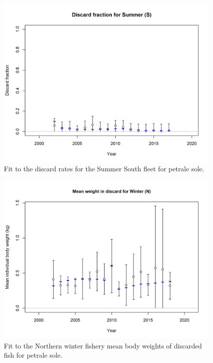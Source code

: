 \documentclass[12pt,]{article}
\begin{document}
\FloatBarrier

\begin{figure}
\centering
\includegraphics{r4ss/plots_mod1/discard_fitSummer (S).png}
\caption{Fit to the discard rates for the Summer South fleet for petrale
sole. \label{fig:fit_ss_discard}}
\end{figure}

\FloatBarrier

\begin{figure}
\centering
\includegraphics{r4ss/plots_mod1/bodywt_fit_fltWinter (N).png}
\caption{Fit to the Northern winter fishery mean body weights of
discarded fish for petrale sole. \label{fig:nw_bodywt_fit}}
\end{figure}
\end{document}
